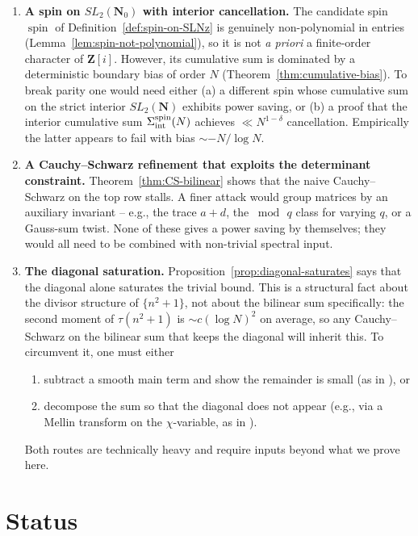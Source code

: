 \documentclass[11pt]{article}
\theoremstyle{definition}
\newcommand{\N}{\mathbf{N}}
\newcommand{\Nz}{\mathbf{N}_0}
\newcommand{\Z}{\mathbf{Z}}
\newcommand{\SLNz}{SL_2(\Nz)}
\newcommand{\SLN}{SL_2(\N)}
\DeclareMathOperator{\spin}{spin}
\begin{document}
\begin{enumerate}
\item[(O1)] {\bf A spin on $\SLNz$ with interior cancellation.} The
candidate spin $\spin$ of Definition~\ref{def:spin-on-SLNz} is genuinely
non-polynomial in entries (Lemma~\ref{lem:spin-not-polynomial}), so it
is not \emph{a priori} a finite-order character of $\Z[i]$. However,
its cumulative sum is dominated by a deterministic boundary bias of
order $N$ (Theorem~\ref{thm:cumulative-bias}). To break parity one
would need either (a) a different spin whose cumulative sum on the
strict interior $\SLN$ exhibits power saving, or (b) a proof that the
interior cumulative sum
$\Sigma_{\textnormal{int}}^{\spin}(N)$ achieves $\ll N^{1-\delta}$
cancellation. Empirically the latter appears to fail with bias
$\sim -N/\log N$.
\item[(O2)] {\bf A Cauchy--Schwarz refinement that exploits the
determinant constraint.} Theorem~\ref{thm:CS-bilinear} shows that the
naive Cauchy--Schwarz on the top row stalls. A finer attack would group
matrices by an auxiliary invariant -- e.g., the trace $a+d$, the
$\bmod\, q$ class for varying $q$, or a Gauss-sum twist. None of these
gives a power saving by themselves; they would all need to be combined
with non-trivial spectral input.
\item[(O3)] {\bf The diagonal saturation.}
Proposition~\ref{prop:diagonal-saturates} says that the diagonal alone
saturates the trivial bound. This is a structural fact about the
divisor structure of $\{n^{2}+1\}$, not about the bilinear sum
specifically: the second moment of $\tau(n^{2}+1)$ is $\sim c(\log N)^{2}$
on average, so any Cauchy--Schwarz on the bilinear sum that keeps the
diagonal will inherit this. To circumvent it, one must either
\begin{enumerate}
\item subtract a smooth main term and show the remainder is small (as in
\cite[\S 5]{FI98b}), or
\item decompose the sum so that the diagonal does not appear (e.g., via
a Mellin transform on the $\chi$-variable, as in
\cite[\S 6]{HB-Li15}).
\end{enumerate}
Both routes are technically heavy and require inputs beyond what we
prove here.
\end{enumerate}

\section{Status}\label{sec:status}
\end{document}

